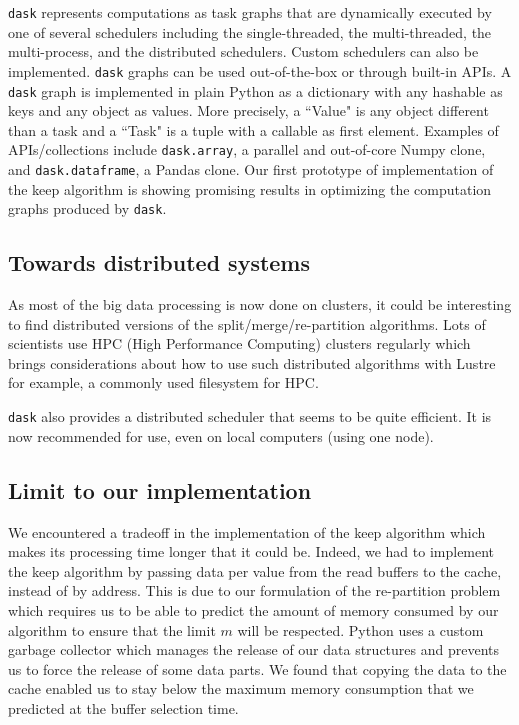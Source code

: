 \documentclass[sigconf, nonacm]{acmart}
\begin{document}
\texttt{dask} represents computations as task graphs that are dynamically executed by one
of several schedulers including the single-threaded, the multi-threaded, the
multi-process, and the distributed schedulers. Custom schedulers can also be
implemented. \texttt{dask} graphs can be used out-of-the-box or through
built-in APIs. A \texttt{dask} graph is implemented in plain Python as a
dictionary with any hashable as keys and any object as values. More precisely,
a ``Value" is any object different than a task and a ``Task" is a tuple with a
callable as first element. Examples of APIs/collections include
\texttt{dask.array}, a parallel and out-of-core
Numpy clone, and \texttt{dask.dataframe}, a Pandas clone.
Our first prototype of implementation of the keep algorithm is showing promising
results in optimizing the computation graphs produced by \texttt{dask}.

\subsection{Towards distributed systems}
As most of the big data processing is now done on clusters, it could be interesting
to find distributed versions of the split/merge/re-partition algorithms.
Lots of scientists use HPC (High Performance Computing) clusters regularly which
brings considerations about how to use such distributed algorithms with Lustre
for example, a commonly used filesystem for HPC.

\texttt{dask} also provides a distributed scheduler that seems to be quite
efficient.
It is now recommended for use, even on local computers (using one node).

\subsection{Limit to our implementation}
We encountered a tradeoff in the implementation of the keep algorithm which
makes its processing time longer that it could be.
Indeed, we had to implement the keep algorithm by passing data per value from
the read buffers to the cache, instead of by address.
This is due to our formulation of the re-partition problem which requires us to
be able to predict the amount of memory consumed by our algorithm to ensure that
the limit $m$ will be respected.
Python uses a custom garbage collector which manages the release of our
data structures and prevents us to force the release of some data parts.
We found that copying the data to the cache enabled us to stay below the
maximum memory consumption that we predicted at the buffer selection time.
\end{document}
